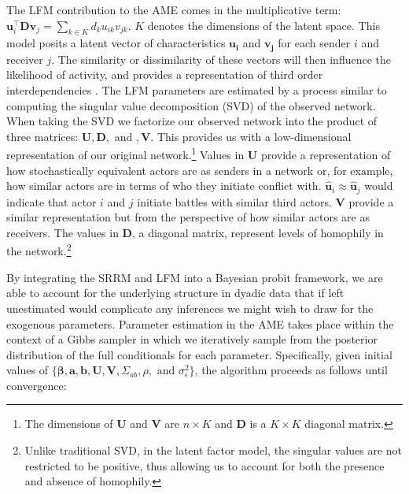 The LFM contribution to the AME comes in the multiplicative term: $\mathbf{u}_{i}^{\top} \mathbf{D} \mathbf{v}_{j}=\sum_{k \in K} d_{k} u_{ik} v_{jk}$. $K$ denotes the dimensions of the latent space. This model posits a latent vector of characteristics $\mathbf{u_{i}}$ and $\mathbf{v_{j}}$ for each sender $i$ and receiver $j$. The similarity or dissimilarity of these vectors will then influence the likelihood of activity, and provides a representation of third order interdependencies \citep{minhas:etal:2016:arxiv}. The LFM parameters are estimated by a process similar to computing the singular value decomposition (SVD) of the observed network. When taking the SVD we factorize our observed network into the product of three matrices: $\mathbf{U}, \mathbf{D}, \text{ and }, \mathbf{V}$. This provides us with a low-dimensional representation of our original network.\footnote{The dimensions of $\mathbf{U}$ and $\mathbf{V}$ are $n \times K$ and $\mathbf{D}$ is a $K \times K$ diagonal matrix.} Values in $\mathbf{U}$ provide a representation of how stochastically equivalent actors are as senders in a network or, for example, how similar actors are in terms of who they initiate conflict with. $\hat{\mathbf{u}}_{i} \approx \hat{\mathbf{u}}_{j}$ would indicate that actor $i$ and $j$ initiate battles with similar third actors. $\mathbf{V}$ provide a similar representation but from the perspective of how similar actors are as receivers. The values in $\mathbf{D}$, a diagonal matrix, represent levels of homophily in the network.\footnote{Unlike traditional SVD, in the latent factor model, the singular values are not restricted to be positive, thus allowing us to account for both the presence and absence of homophily.} 

By integrating the SRRM and LFM into a Bayesian probit framework, we are able to account for the underlying structure in dyadic data that if left unestimated would complicate any inferences we might wish to draw for the exogenous parameters. Parameter estimation in the AME takes place within the context of a Gibbs sampler in which we iteratively sample from the posterior distribution of the full conditionals for each parameter. Specifically, given initial values of $\{\bm\beta, \mathbf{a}, \mathbf{b}, \mathbf{U}, \mathbf{V}, \Sigma_{ab}, \rho, \text{ and } \sigma_{\epsilon}^{2}\}$, the algorithm proceeds as follows until convergence:

